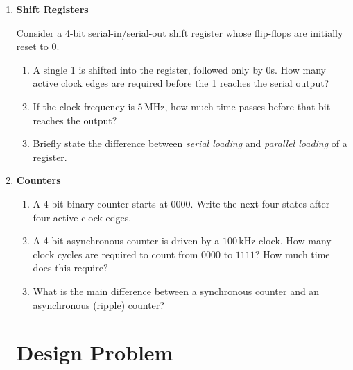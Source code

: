 \documentclass{article}
\begin{document}
\begin{enumerate}
\begin{enumerate}
\vspace{0.7cm}
\end{enumerate}

\item \textbf{Shift Registers}

Consider a 4-bit serial-in/serial-out shift register whose flip-flops
are initially reset to 0.

\begin{enumerate}
\item A single 1 is shifted into the register, followed only by 0s.
How many active clock edges are required before the 1 reaches the
serial output?

\vspace{0.7cm}

\item If the clock frequency is $5\,\mathrm{MHz}$, how much time
passes before that bit reaches the output?

\vspace{0.8cm}

\item Briefly state the difference between \textit{serial loading}
and \textit{parallel loading} of a register.

\vspace{1.0cm}
\end{enumerate}

\item \textbf{Counters}

\begin{enumerate}
\item A 4-bit binary counter starts at $0000$. Write the next four
states after four active clock edges.

\vspace{0.8cm}

\item A 4-bit asynchronous counter is driven by a $100\,\mathrm{kHz}$
clock. How many clock cycles are required to count from $0000$ to
$1111$? How much time does this require?

\vspace{1.0cm}

\item What is the main difference between a synchronous counter and
an asynchronous (ripple) counter?

\vspace{1.0cm}
\end{enumerate}

\section*{Design Problem}


\end{enumerate}
\end{document}
